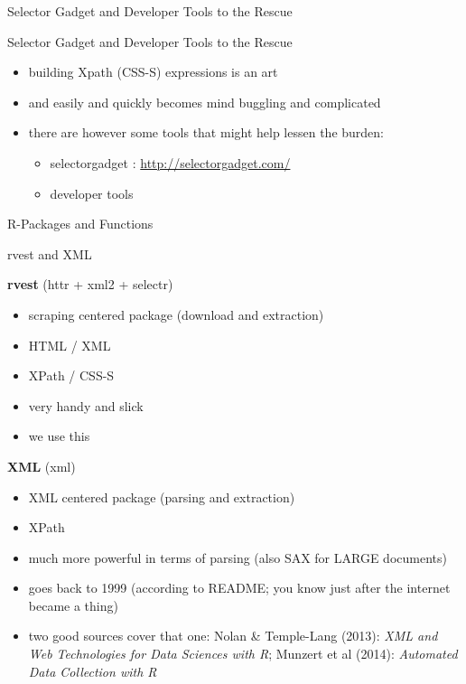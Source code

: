 \documentclass[ignorenonframetext,]{beamer}
\providecommand{\tightlist}{%
  \setlength{\itemsep}{0pt}\setlength{\parskip}{0pt}}
\begin{document}
\begin{frame}{Selector Gadget and Developer Tools to the Rescue}

\begin{block}{Selector Gadget and Developer Tools to the Rescue}

\begin{itemize}
\tightlist
\item
  building Xpath (CSS-S) expressions is an art
\item
  and easily and quickly becomes mind buggling and complicated
\item
  there are however some tools that might help lessen the burden:

  \begin{itemize}
  \tightlist
  \item
    selectorgadget : \url{http://selectorgadget.com/}
  \item
    developer tools
  \end{itemize}
\end{itemize}

\end{block}

\end{frame}

\begin{frame}{R-Packages and Functions}

\begin{block}{rvest and XML}

\textbf{rvest} (httr + xml2 + selectr)

\begin{itemize}
\tightlist
\item
  scraping centered package (download and extraction)
\item
  HTML / XML
\item
  XPath / CSS-S
\item
  very handy and slick
\item
  we use this
\end{itemize}

\textbf{XML} (xml)

\begin{itemize}
\tightlist
\item
  XML centered package (parsing and extraction)
\item
  XPath
\item
  much more powerful in terms of parsing (also SAX for LARGE documents)
\item
  goes back to 1999 (according to README; you know just after the
  internet became a thing)
\item
  two good sources cover that one: Nolan \& Temple-Lang (2013):
  \emph{XML and Web Technologies for Data Sciences with R}; Munzert et
  al (2014): \emph{Automated Data Collection with R}
\end{itemize}

\end{block}

\end{frame}
\end{document}
